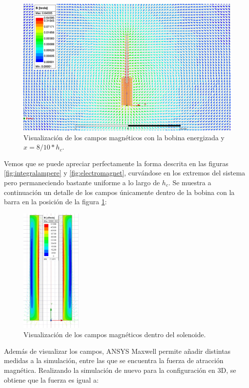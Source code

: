 \begin{figure}[H]
    \centering
    \includegraphics[width=14cm]{FigurasMemoria/fields8.PNG}
    \caption{Visualización de los campos magnéticos con la bobina energizada y \(x=8/10 * h_c\).}
    \label{fig:fields8} %
\end{figure}

Vemos que se puede apreciar perfectamente la forma descrita en las figuras \ref{fig:integralampere} y \ref{fig:electromagnet}, curvándose en los extremos del sistema pero permaneciendo bastante uniforme a lo largo de \(h_c\). Se muestra a continuación un detalle de los campos únicamente dentro de la bobina con la barra en la posición de la figura \ref{fig:fields8}:

\begin{figure}[H]
    \centering
    \includegraphics[width=3cm]{FigurasMemoria/fieldsDetail.jpg}
    \caption{Visualización de los campos magnéticos dentro del solenoide.}
    \label{fig:fieldsDetail} %
\end{figure}

Además de visualizar los campos, ANSYS Maxwell permite añadir distintas medidas a la simulación, entre las que se encuentra la fuerza de atracción magnética. Realizando la simulación de nuevo para la configuración en 3D, se obtiene que la fuerza es igual a:

